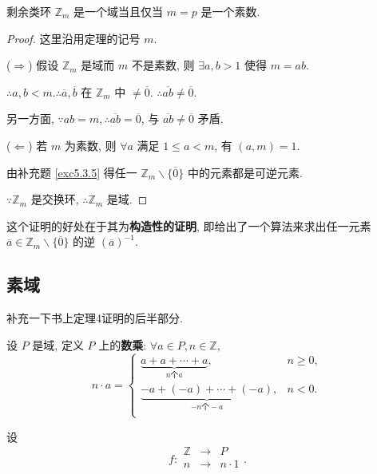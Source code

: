 \documentclass[color=black,device=normal,lang=cn,mode=geye]{elegantnote}
\begin{document}
\begin{theorem}[书上的定理3]
    剩余类环 $\mathbb{Z}_m$ 是一个域当且仅当 $m=p$ 是一个素数.
\end{theorem}
\begin{proof}
    这里沿用定理的记号 $m$.

    ($\Rightarrow$) 假设 $\mathbb{Z}_m$ 是域而 $m$ 不是素数, 则 $\exists a,b>1$ 使得 $m=ab$.

    $\therefore a,b<m.\therefore\overline{a},\overline{b}$ 在 $\mathbb{Z}_m$ 中 $\neq\overline{0}$. $\therefore\overline{ab}\neq\overline{0}$.

    另一方面, $\because ab=m,\therefore\overline{ab}=\overline{0}$, 与 $\overline{ab}\neq\overline{0}$ 矛盾.

    ($\Leftarrow$) 若 $m$ 为素数, 则 $\forall a$ 满足 $1\leq a<m$, 有 $(a,m)=1$.

    由补充题 \ref{exc5.3.5} 得任一 $\mathbb{Z}_m\backslash\{\overline{0}\}$ 中的元素都是可逆元素.

    $\because\mathbb{Z}_m$ 是交换环, $\therefore\mathbb{Z}_m$ 是域.
\end{proof}
这个证明的好处在于其为\textbf{构造性的证明}, 即给出了一个算法来求出任一元素 $\overline{a}\in\mathbb{Z}_m\backslash\{\overline{0}\}$ 的逆 $(\overline{a})^{-1}$.
\subsection{素域}
补充一下书上定理4证明的后半部分.

设 $P$ 是域, 定义 $P$ 上的\textbf{数乘}: $\forall a\in P,n\in\mathbb{Z}$,
\[n\cdot a=\begin{cases}
    \underbrace{a+a+\cdots+a}_{n\text{个}a}, & n\geq0, \\
    \underbrace{-a+(-a)+\cdots+(-a)}_{-n\text{个}-a}, & n<0. \\
\end{cases}\]

设
\[f:\begin{array}{rcl}
    \mathbb{Z} & \to & P \\
    n & \to & n\cdot1 \\
\end{array}.\]
\end{document}
